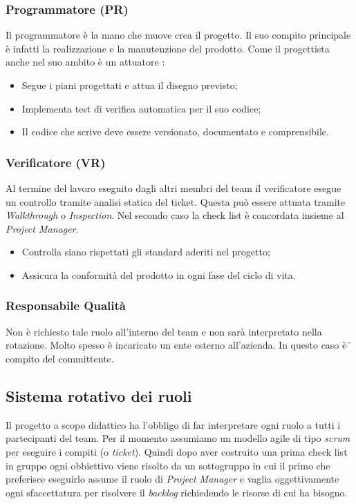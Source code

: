 \documentclass[12pt,a4paper,titlepage]{article}
\begin{document}
\subsubsection{Programmatore (PR)} 
Il programmatore è la mano che muove crea il progetto. Il suo compito principale è infatti la realizzazione e la manutenzione del prodotto. Come il progettista anche nel suo ambito è un attuatore :
\begin{itemize}
	\item Segue i piani progettati e attua il disegno previsto;
	\item Implementa test di verifica automatica per il suo codice;
	\item Il codice che scrive deve essere versionato, documentato e comprensibile.
\end{itemize}

\subsubsection{Verificatore (VR)} 
Al termine del lavoro eseguito dagli altri membri del team il verificatore esegue un controllo tramite analisi statica del ticket. Questa può essere attuata tramite \textit{Walkthrough} o \textit{Inspection}. Nel secondo caso la check list è concordata insieme al \textit{Project Manager}. 
\begin{itemize}
	\item Controlla siano rispettati gli standard aderiti nel progetto;
	\item Assicura la conformità del prodotto in ogni fase del ciclo di vita.
\end{itemize}

\subsubsection{Responsabile Qualità} 
Non è richiesto tale ruolo all'interno del team e non sarà interpretato nella rotazione. Molto spesso è incaricato un ente esterno all'azienda. In questo caso è¨ compito del committente.

\subsection{Sistema rotativo dei ruoli}
Il progetto a scopo didattico ha l'obbligo di far interpretare ogni ruolo a tutti i partecipanti del team. Per il momento assumiamo un modello agile di tipo \textit{scrum} per eseguire i compiti (o \textit{ticket}). Quindi dopo aver costruito una prima check list in gruppo ogni obbiettivo viene risolto da un sottogruppo in cui il primo che preferisce eseguirlo assume il ruolo di \textit{Project Manager} e vaglia oggettivamente ogni sfaccettatura per risolvere il \textit{backlog} richiedendo le risorse di cui ha bisogno.
\end{document}
